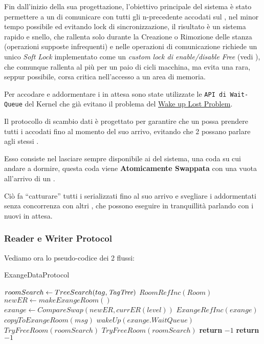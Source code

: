 Fin dall'inizio della sua progettazione, l'obiettivo principale del sistema è stato permettere a un \Writer di
comunicare con tutti gli n-\Reader precedente accodati sul \Topic, nel minor tempo possibile ed evitando lock
di sincronizzazione, il risultato è un sistema rapido e snello, che rallenta solo durante la Creazione o Rimozione
delle stanza (operazioni supposte infrequenti) e nelle operazioni di comunicazione richiede un unico \textit{Soft Lock}
implementato come un \textit{custom lock di enable/disable Free} (vedi ), che comunque
rallenta al più per un paio di cicli macchina, ma evita una rara, seppur possibile, corsa critica nell'accesso a un area
di memoria.

Per accodare e addormentare i \Reader in attesa sono state utilizzate le  \texttt{API di Wait-Queue} del Kernel che già
evitano il problema del \underline{Wake up Lost Problem}.

Il protocollo di scambio dati è progettato per garantire che un \Writer possa prendere tutti i \Reader accodati fino al
momento del suo arrivo, evitando che 2 \Writer possano parlare agli stessi \Reader.

Esso consiste nel lasciare sempre disponibile ai \Reader del sistema, una coda su cui andare a dormire, questa coda
viene \textbf{Atomicamente Swappata}  con una vuota all'arrivo di un \Writer.

Ciò fa ``catturare'' tutti i \Reader serializzati fino al suo arrivo e svegliare i \Reader addormentati senza
concorrenza con altri \Writer, che possono eseguire in tranquillità parlando con i nuovi \Reader in attesa.


\subsubsection{Reader e Writer Protocol}
Vediamo ora lo pseudo-codice dei 2 flussi:

\begin{algorithm}
\caption{\Writer ExangeDataProtocol}\label{writeExange}
\begin{algorithmic}[1]
\State $roomSearch \gets TreeSearch(tag, \textit{TagTree})$
    \State $RoomRefInc(Room)$
        \State $newER \gets makeExangeRoom()$ 
        \State $exange \gets CompareSwap(newER, currER(level))$
        \State $ExangeRefInc(exange)$
        \State $copyToExangeRoom(msg)$
        \State $wakeUp(exange.WaitQueue)$
        \State $TryFreeRoom(roomSearch)$
    \Else
        \State $TryFreeRoom(roomSearch)$
        \State \textbf{return} $-1$
    \EndIf
\Else
    \State \textbf{return} $-1$

\EndIf
\EndProcedure
\end{algorithmic}
\end{algorithm}

